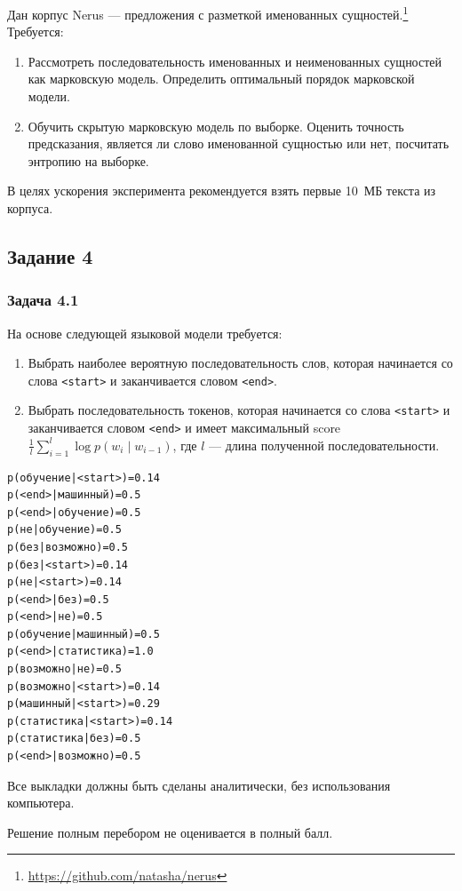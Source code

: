 Дан корпус Nerus --- предложения с разметкой именованных сущностей.\footnote{\url{https://github.com/natasha/nerus}} 
Требуется:
\begin{enumerate}
    \item Рассмотреть последовательность именованных и неименованных сущностей как марковскую модель. Определить оптимальный порядок марковской модели.
    \item Обучить скрытую марковскую модель по выборке. Оценить точность предсказания, является ли слово именованной сущностью или нет, посчитать энтропию на выборке.
\end{enumerate}
\begin{remark}
В целях ускорения эксперимента рекомендуется взять первые 10~МБ текста из корпуса.
\end{remark}

\subsection{Задание 4}


\subsubsection{Задача 4.1}

На основе следующей языковой модели требуется:
\begin{enumerate}
    \item Выбрать наиболее вероятную последовательность слов, которая начинается со слова \texttt{<start>} и заканчивается словом \texttt{<end>}.
    \item Выбрать последовательность токенов, которая начинается со слова \texttt{<start>} и заканчивается словом \texttt{<end>} и имеет максимальный score $\frac{1}{l}\sum_{i=1}^{l}\log p(w_i\mid w_{i-1})$, где $l$ --- длина полученной последовательности.
\end{enumerate}
\begin{verbatim}
p(обучение|<start>)=0.14
p(<end>|машинный)=0.5
p(<end>|обучение)=0.5
p(не|обучение)=0.5
p(без|возможно)=0.5
p(без|<start>)=0.14
p(не|<start>)=0.14
p(<end>|без)=0.5
p(<end>|не)=0.5
p(обучение|машинный)=0.5
p(<end>|статистика)=1.0
p(возможно|не)=0.5
p(возможно|<start>)=0.14
p(машинный|<start>)=0.29
p(статистика|<start>)=0.14
p(статистика|без)=0.5
p(<end>|возможно)=0.5
\end{verbatim}
Все выкладки должны быть сделаны аналитически, без использования компьютера.
\begin{remark}
Решение полным перебором не оценивается в полный балл.
\end{remark}

